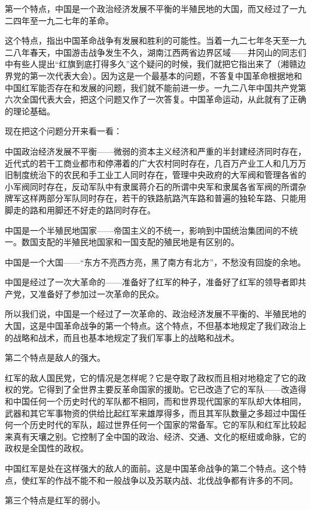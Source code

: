 第一个特点，中国是一个政治经济发展不平衡的半殖民地的大国，而又经过了一九二四年至一九二七年的革命。

这个特点，指出中国革命战争有发展和胜利的可能性。当着一九二七年冬天至一九二八年春天，中国游击战争发生不久，湖南江西两省边界区域——井冈山的同志们中有些人提出“红旗到底打得多久”这个疑问的时候，我们就把它指出来了（湘赣边界党的第一次代表大会）。因为这是一个最基本的问题，不答复中国革命根据地和中国红军能否存在和发展的问题，我们就不能前进一步。一九二八年中国共产党第六次全国代表大会，把这个问题又作了一次答复。中国革命运动，从此就有了正确的理论基础。

现在把这个问题分开来看一看：

中国政治经济发展不平衡——微弱的资本主义经济和严重的半封建经济同时存在，近代式的若干工商业都市和停滞着的广大农村同时存在，几百万产业工人和几万万旧制度统治下的农民和手工业工人同时存在，管理中央政府的大军阀和管理各省的小军阀同时存在，反动军队中有隶属蒋介石的所谓中央军和隶属各省军阀的所谓杂牌军这样两部分军队同时存在，若干的铁路航路汽车路和普遍的独轮车路、只能用脚走的路和用脚还不好走的路同时存在。

中国是一个半殖民地国家——帝国主义的不统一，影响到中国统治集团间的不统一。数国支配的半殖民地国家和一国支配的殖民地是有区别的。

中国是一个大国——“东方不亮西方亮，黑了南方有北方”，不愁没有回旋的余地。

中国是经过了一次大革命的——准备好了红军的种子，准备好了红军的领导者即共产党，又准备好了参加过一次革命的民众。

所以我们说，中国是一个经过了一次革命的、政治经济发展不平衡的、半殖民地的大国，这是中国革命战争的第一个特点。这个特点，不但基本地规定了我们政治上的战略和战术，而且也基本地规定了我们军事上的战略和战术。

第二个特点是敌人的强大。

红军的敌人国民党，它的情况是怎样呢？它是夺取了政权而且相对地稳定了它的政权的党。它得到了全世界主要反革命国家的援助。它已改造了它的军队——改造得和中国任何一个历史时代的军队都不相同，而和世界现代国家的军队却大体相同，武器和其它军事物资的供给比起红军来雄厚得多，而且其军队数量之多超过中国任何一个历史时代的军队，超过世界任何一个国家的常备军。它的军队和红军比较起来真有天壤之别。它控制了全中国的政治、经济、交通、文化的枢纽或命脉，它的政权是全国性的政权。

中国红军是处在这样强大的敌人的面前。这是中国革命战争的第二个特点。这个特点，使红军的作战不能不和一般战争以及苏联内战、北伐战争都有许多的不同。

第三个特点是红军的弱小。


